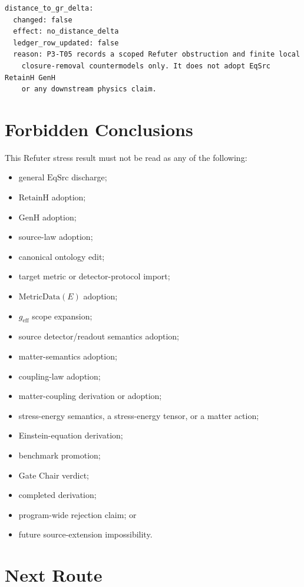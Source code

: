 \documentclass[11pt]{article}
\newcommand{\EqSrc}{\mathrm{EqSrc}}
\newcommand{\RetainH}{\mathrm{RetainH}}
\newcommand{\GenH}{\mathrm{GenH}}
\begin{document}
\begin{verbatim}
distance_to_gr_delta:
  changed: false
  effect: no_distance_delta
  ledger_row_updated: false
  reason: P3-T05 records a scoped Refuter obstruction and finite local
    closure-removal countermodels only. It does not adopt EqSrc RetainH GenH
    or any downstream physics claim.
\end{verbatim}

\section{Forbidden Conclusions}

This Refuter stress result must not be read as any of the following:
\begin{itemize}[leftmargin=*]
  \item general \(\EqSrc\) discharge;
  \item \(\RetainH\) adoption;
  \item \(\GenH\) adoption;
  \item source-law adoption;
  \item canonical ontology edit;
  \item target metric or detector-protocol import;
  \item \(\mathrm{MetricData}(E)\) adoption;
  \item \(g_{\mathrm{eff}}\) scope expansion;
  \item source detector/readout semantics adoption;
  \item matter-semantics adoption;
  \item coupling-law adoption;
  \item matter-coupling derivation or adoption;
  \item stress-energy semantics, a stress-energy tensor, or a matter action;
  \item Einstein-equation derivation;
  \item benchmark promotion;
  \item Gate Chair verdict;
  \item completed derivation;
  \item program-wide rejection claim; or
  \item future source-extension impossibility.
\end{itemize}

\section{Next Route}
\end{document}
